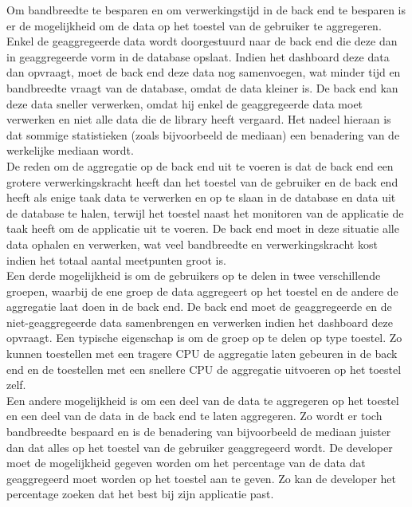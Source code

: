 Om bandbreedte te besparen en om verwerkingstijd in de back end te besparen is er de mogelijkheid om de data op het toestel van de gebruiker te aggregeren. Enkel de geaggregeerde data wordt doorgestuurd naar de back end die deze dan in geaggregeerde vorm in de database opslaat. Indien het dashboard deze data dan opvraagt, moet de back end deze data nog samenvoegen, wat minder tijd en bandbreedte vraagt van de database, omdat de data kleiner is. De back end kan deze data sneller verwerken, omdat hij enkel de geaggregeerde data moet verwerken en niet alle data die de library heeft vergaard. Het nadeel hieraan is dat sommige statistieken (zoals bijvoorbeeld de mediaan) een benadering van de werkelijke mediaan wordt. \\

De reden om de aggregatie op de back end uit te voeren is dat de back end een grotere verwerkingskracht heeft dan het toestel van de gebruiker en de back end heeft als enige taak data te verwerken en op te slaan in de database en data uit de database te halen, terwijl het toestel naast het monitoren van de applicatie de taak heeft om de applicatie uit te voeren. De back end moet in deze situatie alle data ophalen en verwerken, wat veel bandbreedte en verwerkingskracht kost indien het totaal aantal meetpunten groot is. \\

Een derde mogelijkheid is om de gebruikers op te delen in twee verschillende groepen, waarbij de ene groep de data aggregeert op het toestel en de andere de aggregatie laat doen in de back end. De back end moet de geaggregeerde en de niet-geaggregeerde data samenbrengen en verwerken indien het dashboard deze opvraagt. Een typische eigenschap is om de groep op te delen op type toestel. Zo kunnen toestellen met een tragere CPU de aggregatie laten gebeuren in de back end en de toestellen met een snellere CPU de aggregatie uitvoeren op het toestel zelf. \\

Een andere mogelijkheid is om een deel van de data te aggregeren op het toestel en een deel van de data in de back end te laten aggregeren. Zo wordt er toch bandbreedte bespaard en is de benadering van bijvoorbeeld de mediaan juister dan dat alles op het toestel van de gebruiker geaggregeerd wordt. De developer moet de mogelijkheid gegeven worden om het percentage van de data dat geaggregeerd moet worden op het toestel aan te geven. Zo kan de developer het percentage zoeken dat het best bij zijn applicatie past.\\ 

